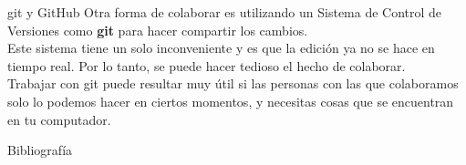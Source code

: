 \documentclass[12pt,aspectratio=43]{beamer}
\begin{document}
\begin{frame}{git y GitHub}{}
Otra forma de colaborar es utilizando un Sistema de Control de Versiones como {\alert{\bf git}} para hacer compartir los cambios.\pause\\[1em]

Este sistema tiene un solo inconveniente y es que la edición ya no se hace en tiempo real. Por lo tanto, se puede hacer tedioso el hecho de colaborar.\pause\\[1em]

Trabajar con git puede resultar muy útil si las personas con las que colaboramos solo lo podemos hacer en ciertos momentos, y necesitas cosas que se encuentran en tu computador.
\end{frame}

\begin{frame}[allowframebreaks]{Bibliografía}
\nocite{*}
\printbibliography
\end{frame}
\end{document}
